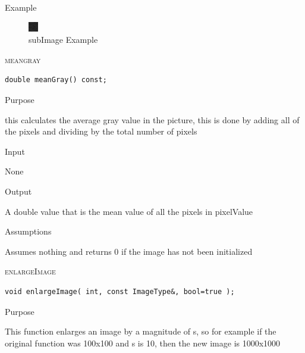 \documentclass[pdftex, 11pt]{article}
\begin{document}
\begin{description}
\begin{description}
			\item{Example}

				\begin{figure}[p]
					\centering
					\caption{subImage Example}
					\includegraphics{images/outsubimg.png}
				\end{figure}

		\end{description}


	\item{\textsc{meangray}}
		\begin{description}

\begin{lstlisting}
double meanGray() const;
\end{lstlisting}

			\item{Purpose}

				
				this calculates the average gray value in the
				picture, this is done by adding
				all of the pixels and dividing by the total
				number of pixels

			\item{Input}

				None

			\item{Output}

				A double value that is the mean value of all
				the pixels in pixelValue


			\item{Assumptions}

				Assumes nothing and returns 0 if the image 
				has not been initialized

		\end{description}


	\item{\textsc{enlargeImage}}
		\begin{description}

\begin{lstlisting}
void enlargeImage( int, const ImageType&, bool=true );
\end{lstlisting}

			\item{Purpose}
				
				This function enlarges an image by a 
				magnitude of s, so for example if the
				original function was 100x100 and s is 
				10, then the new image is 1000x1000


\end{description}
\end{description}
\end{document}
